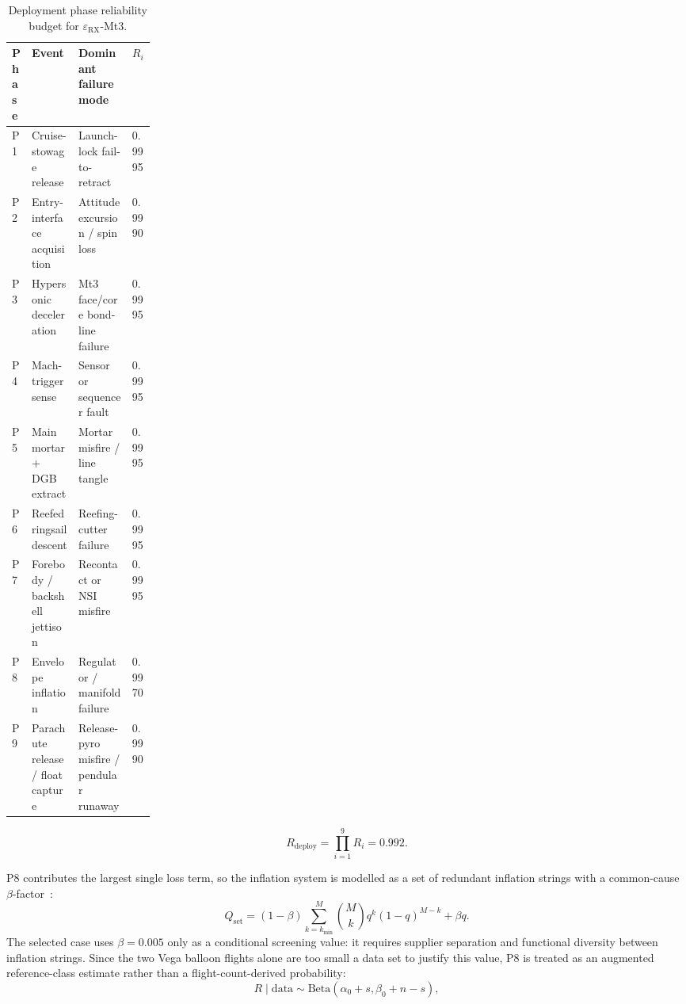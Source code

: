 \begin{table}[H]
    \centering
    \footnotesize
    \renewcommand{\arraystretch}{1}
    \caption{Deployment phase reliability budget for $\varepsilon_{\mathrm{RX}}$-Mt3.}
    \label{tab:deployment_phase_reliability}
    \begin{tabularx}{\linewidth}{p{0.08\linewidth} X X p{0.13\linewidth}}
        \toprule
        \textbf{Phase} & \textbf{Event} & \textbf{Dominant failure mode} & \textbf{$R_i$} \\
        \midrule
        P1 & Cruise-stowage release & Launch-lock fail-to-retract & 0.9995 \\
        P2 & Entry-interface acquisition & Attitude excursion / spin loss & 0.9990 \\
        P3 & Hypersonic deceleration & Mt3 face/core bond-line failure & 0.9995 \\
        P4 & Mach-trigger sense & Sensor or sequencer fault & 0.9995 \\
        P5 & Main mortar + DGB extract & Mortar misfire / line tangle & 0.9995 \\
        P6 & Reefed ringsail descent & Reefing-cutter failure & 0.9995 \\
        P7 & Forebody / backshell jettison & Recontact or NSI misfire & 0.9995 \\
        P8 & Envelope inflation & Regulator / manifold failure & 0.9970 \\
        P9 & Parachute release / float capture & Release-pyro misfire / pendular runaway & 0.9990 \\
        \bottomrule
    \end{tabularx}
\end{table}

\begin{equation}
    R_{\mathrm{deploy}}=\prod_{i=1}^{9}R_i=0.992 .
    \label{eq:deployment_series_reliability}
\end{equation}

P8 contributes the largest single loss term, so the inflation system is modelled as a set of redundant inflation strings with a common-cause $\beta$-factor~\cite{Mosleh1998}:
\begin{equation}
    Q_{\mathrm{set}} =
    (1-\beta)
    \sum_{k=k_{\min}}^{M}
    \binom{M}{k} q^k (1-q)^{M-k}
    + \beta q .
    \label{eq:beta_factor_model}
\end{equation}
The selected case uses $\beta=0.005$ only as a conditional screening value: it requires supplier separation and functional diversity between inflation strings. Since the two Vega balloon flights alone are too small a data set to justify this value, P8 is treated as an augmented reference-class estimate rather than a flight-count-derived probability:
\begin{equation}
    R \mid \mathrm{data}
    \sim
    \mathrm{Beta}\!\left(\alpha_0+s,\beta_0+n-s\right),
    \label{eq:bayesian_reliability_update}
\end{equation}

